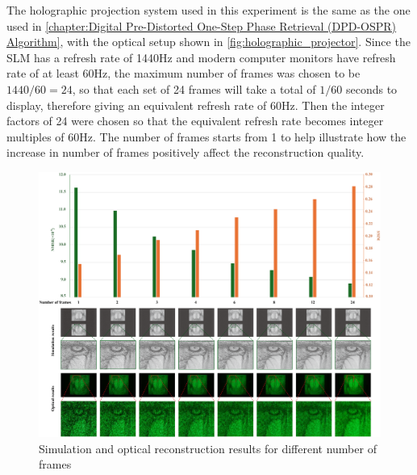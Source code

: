 	The holographic projection system used in this experiment is the same as the one used in \cref{chapter:Digital Pre-Distorted One-Step Phase Retrieval (DPD-OSPR) Algorithm}, with the optical setup shown in \cref{fig:holographic_projector}. Since the SLM has a refresh rate of 1440Hz and modern computer monitors have refresh rate of at least 60Hz, the maximum number of frames was chosen to be $1440/60=24$, so that each set of 24 frames will take a total of $1/60$ seconds to display, therefore giving an equivalent refresh rate of 60Hz. Then the integer factors of 24 were chosen so that the equivalent refresh rate becomes integer multiples of 60Hz. The number of frames starts from 1 to help illustrate how the increase in number of frames positively affect the reconstruction quality.

	\begin{figure}[H]
		\centering
		\includegraphics[width=1.0\textwidth]{recon_quality_vs_num_frames.pdf}
		\caption{Simulation and optical reconstruction results for different number of frames}
		\label{fig:recon_quality_vs_num_frames}
	\end{figure}

